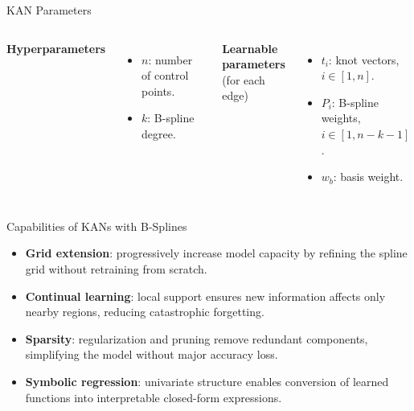 \documentclass[aspectratio=169]{beamer}
\begin{document}

\begin{frame}{KAN Parameters}
	
	\begin{columns}[T,onlytextwidth]
		
		\centering
		\resizebox{\linewidth}{!}{}
		
		
		\textbf{Hyperparameters}
		\begin{itemize}
			\item $n$: number of control points.
			\item $k$: B-spline degree.
		\end{itemize}
		
		\vspace{0.8em}
		\textbf{Learnable parameters}\\(for each edge)
		\begin{itemize}
			\item $t_i$: knot vectors, $i \in [1, n]$.
			\item $P_i$: B-spline weights, $i \in [1, n-k-1]$.
			\item $w_b$: basis weight.
		\end{itemize}
		
	\end{columns}
	
\end{frame}


\begin{frame}{Capabilities of KANs with B-Splines}
	
	\begin{itemize}
		\item \textbf{Grid extension}: progressively increase model capacity by refining the spline grid without retraining from scratch.
		\item \textbf{Continual learning}: local support ensures new information affects only nearby regions, reducing catastrophic forgetting.
		\item \textbf{Sparsity}: regularization and pruning remove redundant components, simplifying the model without major accuracy loss.
		\item \textbf{Symbolic regression}: univariate structure enables conversion of learned functions into interpretable closed-form expressions.
	\end{itemize}
	
\end{frame}
\end{document}
